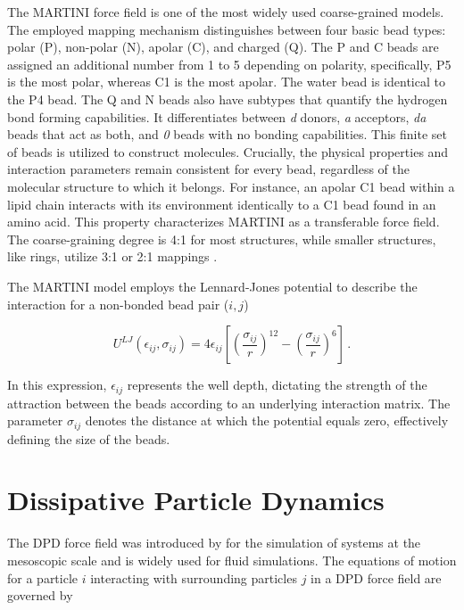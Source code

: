 \documentclass[
    11pt,
    a4paper,
    oneside,        %
    BCOR=10mm,      %
    parskip=half,   %
    listof=nototoc,   %
    bibliography=totoc %
]{scrreprt}
\begin{document}
The MARTINI force field \cite{Martini} is one of the most widely used coarse-grained models. The employed mapping mechanism distinguishes between four basic bead types: polar (P), non-polar (N), apolar (C), and charged (Q). The P and C beads are assigned an additional number from 1 to 5 depending on polarity, specifically, P5 is the most polar, whereas C1 is the most apolar. The water bead is identical to the P4 bead. The Q and N beads also have subtypes that quantify the hydrogen bond forming capabilities. It differentiates between \textit{d} donors, \textit{a} acceptors, \textit{da} beads that act as both, and \textit{0} beads with no bonding capabilities. This finite set of beads is utilized to construct molecules. Crucially, the physical properties and interaction parameters remain consistent for every bead, regardless of the molecular structure to which it belongs. For instance, an apolar C1 bead within a lipid chain interacts with its environment identically to a C1 bead found in an amino acid. This property characterizes MARTINI as a transferable force field. The coarse-graining degree is 4:1 for most structures, while smaller structures, like rings, utilize 3:1 or 2:1 mappings \cite{Martini}.    

The MARTINI model employs the Lennard-Jones potential to describe the interaction for a non-bonded bead pair ($i,j$)

\begin{equation}
U^{LJ}(\epsilon_{ij}, \sigma_{ij}) = 4 \epsilon_{ij} \left [\left(\frac{\sigma_{ij}}{r} \right)^{12}
- \left(\frac{\sigma_{ij}}{r} \right)^6 \right ]\, . \label{LJ_pot}
\end{equation}

In this expression, $\epsilon_{ij}$ represents the well depth,  dictating the strength of the attraction between the beads according to an underlying interaction matrix. The parameter $\sigma_{ij}$ denotes the distance at which the potential equals zero, effectively defining the size of the beads.

\section{Dissipative Particle Dynamics} \label{dpd}
The DPD force field was introduced by \citeauthor{DPD_groot_warren} \cite{DPD_groot_warren} for the simulation of systems at the mesoscopic scale and is widely used for fluid simulations. The equations of motion for a particle $i$ interacting with surrounding particles $j$ in a DPD force field are governed by
\end{document}
